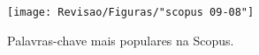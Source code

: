\begin{figure}[htp!]
	\centering
	\caption{Palavras-chave mais populares na Scopus.}
	\label{fig:scopus-09-08}
	\texttt{[image: Revisao/Figuras/"scopus 09-08"]}
	
\end{figure}
